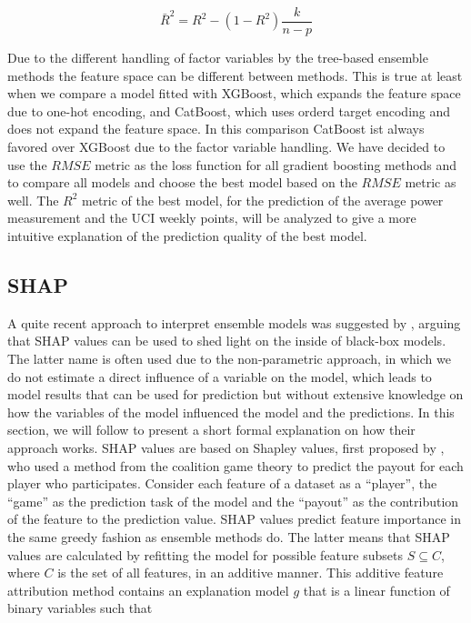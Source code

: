 \documentclass[12pt,a4paper]{article}
\begin{document}
\begin{equation}
\bar{R}^{2}=R^{2}-\left(1-R^{2}\right) \frac{k}{n-p}
\end{equation}

Due to the different handling of factor variables by the tree-based ensemble methods the feature space can be different between methods. This is true at least when we compare a model fitted with XGBoost, which expands the feature space due to one-hot encoding, and CatBoost, which uses orderd target encoding and does not expand the feature space. In this comparison CatBoost ist always favored over XGBoost due to the factor variable handling. We have decided to use the \(RMSE\) metric as the loss function for all gradient boosting methods and to compare all models and choose the best model based on the \(RMSE\) metric as well. The \(R^2\) metric of the best model, for the prediction of the average power measurement and the UCI weekly points, will be analyzed to give a more intuitive explanation of the prediction quality of the best model.

\hypertarget{shap}{%
\subsection{SHAP}\label{shap}}

A quite recent approach to interpret ensemble models was suggested by \textcite{Lundberg2017}, arguing that SHAP values can be used to shed light on the inside of black-box models. The latter name is often used due to the non-parametric approach, in which we do not estimate a direct influence of a variable on the model, which leads to model results that can be used for prediction but without extensive knowledge on how the variables of the model influenced the model and the predictions. In this section, we will follow \textcite{Lundberg2017} to present a short formal explanation on how their approach works. SHAP values are based on Shapley values, first proposed by \textcite{Shapley1952}, who used a method from the coalition game theory to predict the payout for each player who participates. Consider each feature of a dataset as a ``player'', the ``game'' as the prediction task of the model and the ``payout'' as the contribution of the feature to the prediction value. SHAP values predict feature importance in the same greedy fashion as ensemble methods do. The latter means that SHAP values are calculated by refitting the model for possible feature subsets \(S \subseteq C\), where \(C\) is the set of all features, in an additive manner. This additive feature attribution method contains an explanation model \(g\) that is a linear function of binary variables such that
\end{document}
